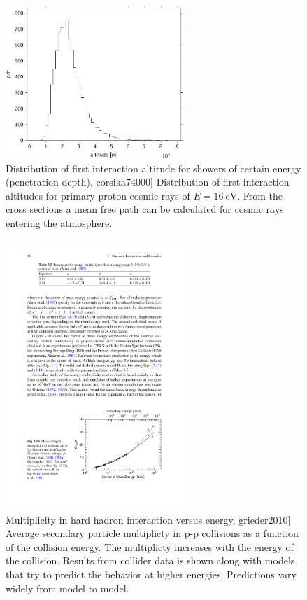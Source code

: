 \begin{figure}
    \centering
    \includegraphics[width=0.6\textwidth]
                    {plots/cosmic-rays/first_interaction_altitude}
    \caption{Distribution of first interaction altitude for showers of certain energy (penetration depth), corsika74000]
Distribution of first interaction altitudes for primary proton cosmic-rays of $E = \SI{16}{\eV}$. From the cross sections a mean free path can be calculated for cosmic rays entering the atmosphere.}
    \label{fig:first_interaction_altitude}
\end{figure}


\begin{figure}
    \centering
    \includegraphics[width=0.6\textwidth]
                    {plots/cosmic-rays/multiplicity}
    \caption{Multiplicity in hard hadron interaction versus energy, grieder2010]
Average secondary particle multiplicty in p-p collisions as a function of the collision energy. The multiplicty increases with the energy of the collision. Results from collider data is shown along with models that try to predict the behavior at higher energies. Predictions vary widely from model to model.}
    \label{fig:multiplicity}
\end{figure}

